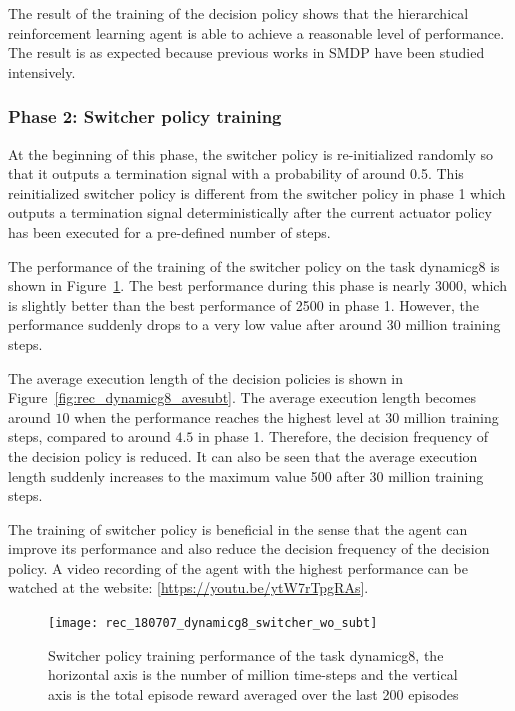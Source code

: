The result of the training of the decision policy shows that the hierarchical reinforcement learning agent is able to achieve a reasonable level of performance. The result is as expected because previous works in SMDP have been studied intensively.

\subsubsection{Phase 2: Switcher policy training}
At the beginning of this phase, the switcher policy is re-initialized randomly so that it outputs a termination signal with a probability of around 0.5. This reinitialized switcher policy is different from the switcher policy in phase 1 which outputs a termination signal deterministically after the current actuator policy has been executed for a pre-defined number of steps. 

The performance of the training of the switcher policy on the task dynamicg8 is shown in Figure~\ref{fig:rec_dynamicg8_switcher}. The best performance during this phase is nearly 3000, which is slightly better than the best performance of 2500 in phase 1. However, the performance suddenly drops to a very low value after around 30 million training steps.

The average execution length of the decision policies is shown in Figure~\ref{fig:rec_dynamicg8_avesubt}. The average execution length becomes around $10$ when the performance reaches the highest level at 30 million training steps, compared to around $4.5$ in phase 1. Therefore, the decision frequency of the decision policy is reduced. It can also be seen that the average execution length suddenly increases to the maximum value 500 after 30 million training steps.

The training of switcher policy is beneficial in the sense that the agent can improve its performance and also reduce the decision frequency of the decision policy. A video recording of the agent with the highest performance can be watched at  the website: [\url{https://youtu.be/ytW7rTpgRAs}].

\begin{figure}[!htbp]
	\centering
	\texttt{[image: rec\_180707\_dynamicg8\_switcher\_wo\_subt]}
	\caption{Switcher policy training performance of the task dynamicg8, the horizontal axis is the number of million time-steps and the vertical axis is the total episode reward averaged over the last 200 episodes}
	\label{fig:rec_dynamicg8_switcher}
\end{figure}

